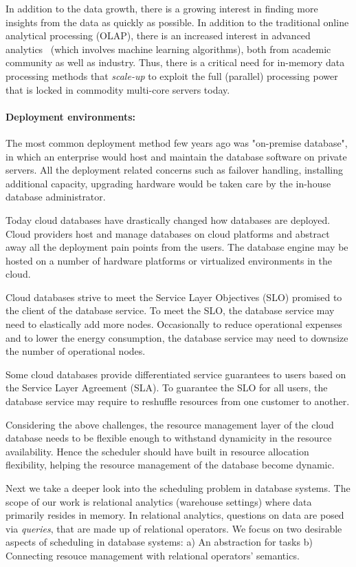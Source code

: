 In addition to the data growth, there is a growing interest in finding more insights from the data as quickly as possible.
In addition to the traditional online analytical processing (OLAP), there is an increased interest in advanced analytics~\cite{DBLP:conf/sigmod/Kumar0017} (which involves machine learning algorithms), both from academic community as well as industry. 
Thus, there is a critical need for in-memory data processing methods that \textit{scale-up} to exploit the full (parallel) processing power that is locked in commodity multi-core servers today.

\paragraph{Deployment environments:} 
The most common deployment method few years ago was "on-premise database", in which an enterprise would host and maintain the database software on private servers. 
All the deployment related concerns such as failover handling, installing additional capacity, upgrading hardware would be taken care by the in-house database administrator. 

Today cloud databases have drastically changed how databases are deployed.
Cloud providers host and manage databases on cloud platforms and abstract away all the deployment pain points from the users.
The database engine may be hosted on a number of hardware platforms or virtualized environments in the cloud.

Cloud databases strive to meet the Service Layer Objectives (SLO) promised to the client of the database service. 
To meet the SLO, the database service may need to elastically add more nodes. 
Occasionally to reduce operational expenses and to lower the energy consumption, the database service may need to downsize the number of operational nodes.

Some cloud databases provide differentiated service guarantees to users based on the Service Layer Agreement (SLA). 
To guarantee the SLO for all users, the database service may require to reshuffle resources from one customer to another. 

Considering the above challenges, the resource management layer of the cloud database needs to be flexible enough to withstand dynamicity in the resource availability.
Hence the scheduler should have built in resource allocation flexibility, helping the resource management of the database become dynamic.

Next we take a deeper look into the scheduling problem in database systems.
The scope of our work is relational analytics (warehouse settings) where data primarily resides in memory. 
In relational analytics, questions on data are posed via \textit{queries}, that are made up of relational operators. 
We focus on two desirable aspects of scheduling in database systems: a) An abstraction for tasks b) Connecting resouce management with relational operators' semantics.

